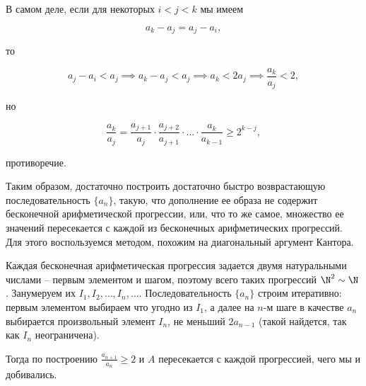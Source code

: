 		В самом деле, если для некоторых $i < j < k$ мы имеем

		\begin{equation*}
			a_k - a_j = a_j - a_i,
		\end{equation*}

		то

		\begin{equation*}
			a_j - a_i < a_j \implies a_k - a_j < a_j \implies a_k < 2 a_j \implies \frac{a_k}{a_j} < 2,
		\end{equation*}

		но

		\begin{equation*}
			\frac{a_k}{a_j} = \frac{a_{j+1}}{a_j} \cdot \frac{a_{j+2}}{a_{j+1}} \cdot \dots \cdot \frac{a_k}{a_{k-1}} \ge 2^{k-j},
		\end{equation*}

		противоречие.

		Таким образом, достаточно построить достаточно быстро возврастающую последовательность $\{a_n\}$, такую, что дополнение ее образа не содержит бесконечной арифметической прогрессии, или, что то же самое, множество ее значений пересекается с каждой из бесконечных арифметических прогрессий. Для этого воспользуемся методом, похожим на диагональный аргумент Кантора.

		Каждая бесконечная арифметическая прогрессия задается двумя натуральными числами -- первым элементом и шагом, поэтому всего таких прогрессий $\N^2 \sim \N$. Занумеруем их $I_1, I_2, \dots, I_n, \dots$. Последовательность $\{a_n\}$ строим итеративно: первым элементом выбираем что угодно из $I_1$, а далее на $n$-м шаге в качестве $a_n$ выбирается произвольный элемент $I_n$, не меньший $2 a_{n-1}$ (такой найдется, так как $I_n$ неограничена).

		Тогда по построению $\frac{a_{n+1}}{a_n} \ge 2$ и $A$ пересекается с каждой прогрессией, чего мы и добивались.


